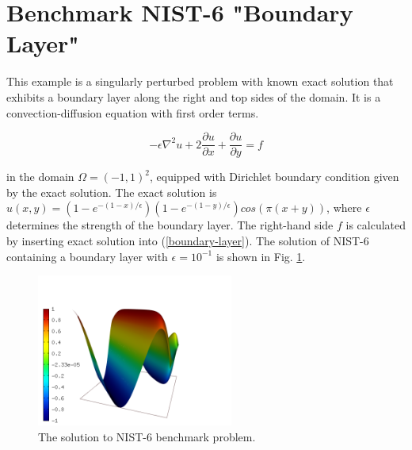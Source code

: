 \section{Benchmark NIST-6 "Boundary Layer"}
\label{sec:bench-6}

This example is a singularly perturbed problem with known exact solution that exhibits
a boundary layer along the right and top sides of the domain.
It is a convection-diffusion equation with first order terms.

\begin{equation} \label{boundary-layer}
-\epsilon \nabla^{2} u + 2\frac{\partial u}{\partial x} + \frac{\partial u}{\partial y} = f
\end{equation}

in the domain $\Omega = (-1, 1)^2$, equipped with Dirichlet boundary condition
given by the exact solution. The exact solution is 
$u(x,y) = (1 - e^{-(1 - x) / \epsilon})(1 - e^{-(1 - y) / \epsilon})cos(\pi (x + y))$, 
where $\epsilon$ determines the strength of the boundary layer.
The right-hand side $f$ is calculated by inserting exact solution into (\ref{boundary-layer}).
The solution of NIST-6 containing a boundary layer
with $\epsilon = 10^{-1}$ is shown in Fig. \ref{fig:sln-nist06}.

\begin{figure}[!ht]
\centering
\includegraphics[height=5cm]{nist/nist-6/solution.png}
\caption{The solution to NIST-6 benchmark problem.}
\label{fig:sln-nist06}
\end{figure}

